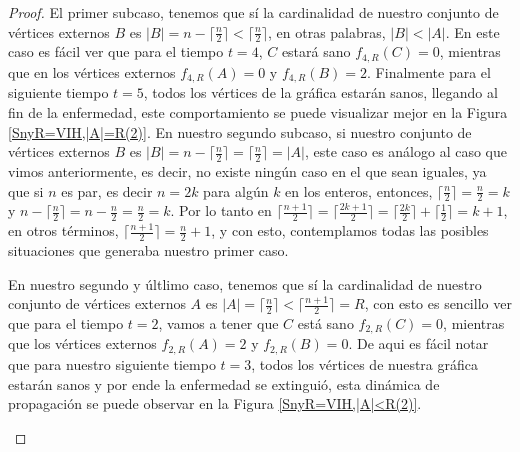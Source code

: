 \documentclass[12pt,titlepage,twoside,openright]{book}
\begin{document}
\begin{proof}
    El primer subcaso, tenemos que s\'i la cardinalidad de nuestro conjunto de v\'ertices externos $B$ es $|B|= n-\lceil \frac{n}{2} \rceil < \lceil \frac{n}{2} \rceil$, en otras palabras, $|B|<|A|$. En este caso es f\'acil ver que para el tiempo $t=4$, $C$ estar\'a sano $f_{4,R}(C)=0$, mientras que en los v\'ertices externos $f_{4,R}(A)=0$ y $f_{4,R}(B)=2$. Finalmente para el siguiente tiempo $t=5$, todos los v\'ertices de la gr\'afica estar\'an sanos, llegando al fin de la enfermedad, este comportamiento se puede visualizar mejor en la Figura \ref{SnyR=VIH,|A|=R(2)}. En nuestro segundo subcaso, si nuestro conjunto de v\'ertices externos $B$ es $|B|= n-\lceil \frac{n}{2} \rceil = \lceil \frac{n}{2} \rceil=|A|$, este caso es an\'alogo al caso que vimos anteriormente, es decir, no existe ning\'un caso en el que sean iguales, ya que si $n$ es par, es decir $n=2k$ para alg\'un $k$ en los enteros, entonces, $\lceil \frac{n}{2} \rceil = \frac{n}{2} = k$ y $n - \lceil \frac{n}{2} \rceil = n - \frac{n}{2} = \frac{n}{2} = k$. Por lo tanto en $\lceil \frac{n+1}{2} \rceil = \lceil \frac{2k+1}{2} \rceil = \lceil \frac{2k}{2} \rceil + \lceil \frac{1}{2} \rceil = k+1$, en otros t\'erminos, $\lceil \frac{n+1}{2} \rceil = \frac{n}{2} + 1$, y con esto, contemplamos todas las posibles situaciones que generaba nuestro primer caso. 

    En nuestro segundo y \'ultlimo caso, tenemos que s\'i la cardinalidad de nuestro conjunto de v\'ertices externos $A$ es $|A|= \lceil \frac{n}{2} \rceil < \lceil \frac{n+1}{2} \rceil=R$, con esto es sencillo ver que para el tiempo $t=2$, vamos a tener que $C$ est\'a sano $f_{2,R}(C)=0$, mientras que los v\'ertices externos $f_{2,R}(A)=2$ y $f_{2,R}(B)=0$. De aqui es f\'acil notar que para nuestro siguiente tiempo $t=3$, todos los v\'ertices de nuestra gr\'afica estar\'an sanos y por ende la enfermedad se extingui\'o, esta din\'amica de propagaci\'on se puede observar en la Figura \ref{SnyR=VIH,|A|<R(2)}.
    \begin{figure}[h]
    \centering
    \begin{subfigure}[h]{0.8\linewidth}
\end{subfigure}
\end{figure}
\end{proof}
\end{document}
